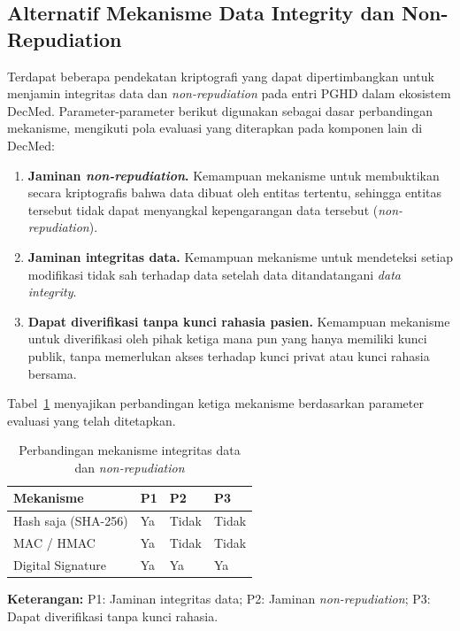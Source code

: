 \subsection{Alternatif Mekanisme Data Integrity dan Non-Repudiation}

Terdapat beberapa pendekatan kriptografi yang dapat dipertimbangkan untuk menjamin integritas data dan \textit{non-repudiation} pada entri PGHD dalam ekosistem DecMed.
Parameter-parameter berikut digunakan sebagai dasar perbandingan mekanisme, mengikuti pola evaluasi yang diterapkan pada komponen lain di DecMed:

\begin{enumerate}
    \item \textbf{Jaminan \textit{non-repudiation}.} 
    Kemampuan mekanisme untuk membuktikan secara kriptografis bahwa data dibuat oleh entitas tertentu, sehingga entitas tersebut tidak dapat menyangkal kepengarangan data tersebut (\textit{non-repudiation}).
    \item \textbf{Jaminan integritas data.} 
    Kemampuan mekanisme untuk mendeteksi setiap modifikasi tidak sah terhadap data setelah data ditandatangani \textit{data integrity}.
    \item \textbf{Dapat diverifikasi tanpa kunci rahasia pasien.} 
    Kemampuan mekanisme untuk diverifikasi oleh pihak ketiga mana pun yang hanya memiliki kunci publik, tanpa memerlukan akses terhadap kunci privat atau kunci rahasia bersama.
\end{enumerate}

Tabel~\ref{tab:perbandingan-mekanisme-security} menyajikan perbandingan ketiga mekanisme berdasarkan parameter evaluasi yang telah ditetapkan.

\begin{table}[htbp]
    \centering
    \caption{Perbandingan mekanisme integritas data dan \textit{non-repudiation}}\label{tab:perbandingan-mekanisme-security}
    \renewcommand{\arraystretch}{1.25}
    \begin{tabularx}{\textwidth}{>{\raggedright\arraybackslash}X
        >{\centering\arraybackslash}p{}
        >{\centering\arraybackslash}p{}
        >{\centering\arraybackslash}p{}}
        \rowcolor[HTML]{DDEBF7}
        \textbf{Mekanisme} & \textbf{P1} & \textbf{P2} & \textbf{P3} \\
        \midrule
        Hash saja (SHA-256) & Ya & Tidak & Tidak \\
        \midrule
        MAC / HMAC & Ya & Tidak & Tidak \\
        \midrule
        Digital Signature & Ya & Ya & Ya \\
        \bottomrule
    \end{tabularx}
    \bigskip

    \noindent\footnotesize
    \textbf{Keterangan:}
    P1: Jaminan integritas data;
    P2: Jaminan \textit{non-repudiation};
    P3: Dapat diverifikasi tanpa kunci rahasia.
\end{table}

